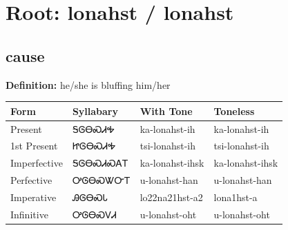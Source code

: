 \documentclass{article}%
\begin{document}
%
\normalsize%
\section*{Root: lonahst / lonahst}%
\subsection*{cause}%
\textbf{Definition: }%
he/she is bluffing him/her%
\\[0.5em]%
\begin{tabular}{|l|l|l|l|}%
\hline%
\textbf{Form}&\textbf{Syllabary}&\textbf{With Tone}&\textbf{Toneless}\\%
\hline%
Present&ᎦᎶᎾᏍᏗᎭ&ka{-}lonahst{-}ih&ka{-}lonahst{-}ih\\%
1st Present&ᏥᎶᎾᏍᏗᎭ&tsi{-}lonahst{-}ih&tsi{-}lonahst{-}ih\\%
Imperfective&ᎦᎶᎾᏍᏗᏍᎪᎢ&ka{-}lonahst{-}ihsk&ka{-}lonahst{-}ihsk\\%
Perfective&ᎤᎶᎾᏍᏔᏅᎢ&u{-}lonahst{-}han&u{-}lonahst{-}han\\%
Imperative&ᎯᎶᎾᏍᏓ&lo22na21hst{-}a2&lona1hst{-}a\\%
Infinitive&ᎤᎶᎾᏍᏙᏗ&u{-}lonahst{-}oht&u{-}lonahst{-}oht\\%
\hline%
\end{tabular}%
\\[1em]%
\end{document}
